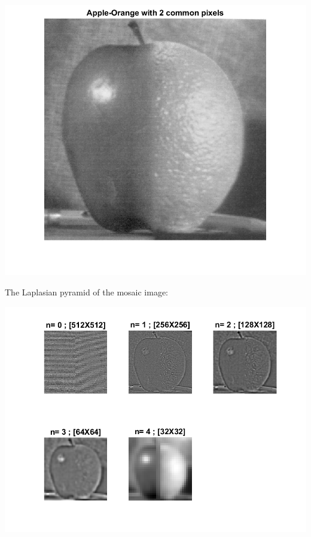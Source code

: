 \documentclass[a4paper]{iacas}
\begin{document}
\vskip 0.1in
\begin{minipage}{1\textwidth}
\centering
	\includegraphics[scale=0.9]{../imgs/imgs_q5/q5_apple_orange_lapl_1.png}
\end{minipage}
\vskip 0.1in

The Laplasian pyramid of the mosaic image:

\vskip 0.1in
\begin{minipage}{1\textwidth}
\centering
	\includegraphics[scale=0.9]{../imgs/imgs_q5/q5_apple_orange_lapl.png}
\end{minipage}
\vskip 0.1in
\end{document}
